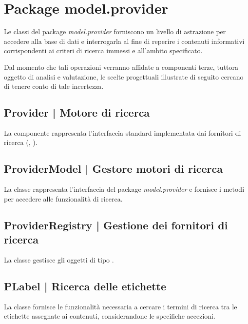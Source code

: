 \documentclass[10pt,a4paper,headinclude,footinclude,hidelinks]{scrreprt} %
\begin{document}
	\section{Package model.provider}
	\label{sec:stage:design:sistema:model.provider}
	Le classi del package \textit{model.provider} forniscono un livello di astrazione per accedere alla base di dati e interrogarla al fine di reperire i contenuti informativi corrispondenti ai criteri di ricerca immessi e all'ambito specificato.

	Dal momento che tali operazioni verranno affidate a componenti terze, tuttora oggetto di analisi e valutazione, le scelte progettuali illustrate di seguito cercano di tenere conto di tale incertezza.

	\subsection[Provider]{Provider | Motore di ricerca}
	\label{sec:stage:design:sistema:model.search:search-provider}
	La componente rappresenta l'interfaccia standard implementata dai fornitori di ricerca (\textit{}, \textit{}).

	\subsection[ProviderModel]{ProviderModel | Gestore motori di ricerca}
	\label{sec:stage:design:sistema:model.search:provider-model}
	La classe \textit{} rappresenta l'interfaccia del package \textit{model.provider} e fornisce i metodi per accedere alle funzionalità di ricerca.

	\subsection[ProviderRegistry]{ProviderRegistry | Gestione dei fornitori di ricerca}
	\label{sec:stage:design:sistema:model.search:provider-registry}
	La classe \textit{} gestisce gli oggetti di tipo \textit{}.

	\subsection[PLabel]{PLabel | Ricerca delle etichette}
	\label{sec:stage:design:sistema:model.search:tag-provider}
	La classe \textit{} fornisce le funzionalità necessaria a cercare i termini di ricerca tra le etichette assegnate ai contenuti, considerandone le specifiche accezioni.
\end{document}
